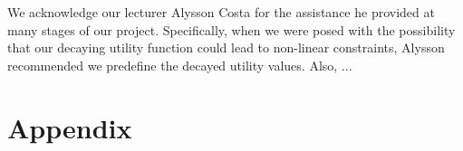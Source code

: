 \documentclass[12pt]{article}
\begin{document}
We acknowledge our lecturer Alysson Costa for the assistance he provided at many stages of our project. Specifically, when we were posed with the possibility that our decaying utility function could lead to non-linear constraints, Alysson recommended we predefine the decayed utility values. Also, ...





\section{Appendix}
\label{sec:appen}
\end{document}
